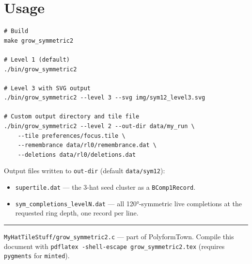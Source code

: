 \documentclass[10pt,a4paper]{article}
\let\polysection\section
\renewcommand\section{\needspace{0.16\textheight}\polysection}
\newcommand{\code}[1]{\texttt{\small #1}}
\newcommand{\file}[1]{\texttt{\footnotesize #1}}
\begin{document}
\section{Usage}

\begin{verbatim}
# Build
make grow_symmetric2

# Level 1 (default)
./bin/grow_symmetric2

# Level 3 with SVG output
./bin/grow_symmetric2 --level 3 --svg img/sym12_level3.svg

# Custom output directory and tile file
./bin/grow_symmetric2 --level 2 --out-dir data/my_run \
    --tile preferences/focus.tile \
    --remembrance data/rl0/remembrance.dat \
    --deletions data/rl0/deletions.dat
\end{verbatim}

\medskip
\noindent Output files written to \code{out-dir} (default \file{data/sym12}):

\begin{itemize}
  \item \file{supertile.dat} — the 3-hat seed cluster as a \code{BComp1Record}.
  \item \file{sym\_completions\_levelN.dat} — all 120°-symmetric live
    completions at the requested ring depth, one record per line.
\end{itemize}

\vspace{4pt}
\noindent\rule{\linewidth}{0.6pt}
\vspace{2pt}

{\small\color{gray}
\file{MyHatTileStuff/grow\_symmetric2.c} — part of PolyformTown.
Compile this document with \texttt{pdflatex -shell-escape grow\_symmetric2.tex}
(requires \texttt{pygments} for \texttt{minted}).
}
\end{document}
